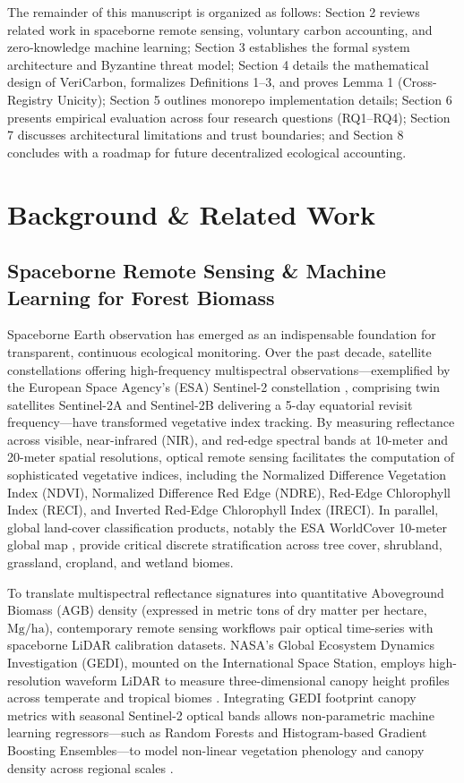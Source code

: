\documentclass[preprint,12pt]{elsarticle}
\begin{document}
The remainder of this manuscript is organized as follows: Section 2 reviews related work in spaceborne remote sensing, voluntary carbon accounting, and zero-knowledge machine learning; Section 3 establishes the formal system architecture and Byzantine threat model; Section 4 details the mathematical design of VeriCarbon, formalizes Definitions 1–3, and proves Lemma 1 (Cross-Registry Unicity); Section 5 outlines monorepo implementation details; Section 6 presents empirical evaluation across four research questions (RQ1–RQ4); Section 7 discusses architectural limitations and trust boundaries; and Section 8 concludes with a roadmap for future decentralized ecological accounting.


\section{Background \& Related Work}

\subsection{Spaceborne Remote Sensing \& Machine Learning for Forest Biomass}

Spaceborne Earth observation has emerged as an indispensable foundation for transparent, continuous ecological monitoring. Over the past decade, satellite constellations offering high-frequency multispectral observations—exemplified by the European Space Agency's (ESA) Sentinel-2 constellation \cite{drusch2012sentinel}, comprising twin satellites Sentinel-2A and Sentinel-2B delivering a 5-day equatorial revisit frequency—have transformed vegetative index tracking. By measuring reflectance across visible, near-infrared (NIR), and red-edge spectral bands at 10-meter and 20-meter spatial resolutions, optical remote sensing facilitates the computation of sophisticated vegetative indices, including the Normalized Difference Vegetation Index (NDVI), Normalized Difference Red Edge (NDRE), Red-Edge Chlorophyll Index (RECI), and Inverted Red-Edge Chlorophyll Index (IRECI). In parallel, global land-cover classification products, notably the ESA WorldCover 10-meter global map \cite{zanaga2021esa}, provide critical discrete stratification across tree cover, shrubland, grassland, cropland, and wetland biomes.

To translate multispectral reflectance signatures into quantitative Aboveground Biomass (AGB) density (expressed in metric tons of dry matter per hectare, $\text{Mg}/\text{ha}$), contemporary remote sensing workflows pair optical time-series with spaceborne LiDAR calibration datasets. NASA's Global Ecosystem Dynamics Investigation (GEDI), mounted on the International Space Station, employs high-resolution waveform LiDAR to measure three-dimensional canopy height profiles across temperate and tropical biomes \cite{dubayah2020global,duncanson2022aboveground}. Integrating GEDI footprint canopy metrics with seasonal Sentinel-2 optical bands allows non-parametric machine learning regressors—such as Random Forests and Histogram-based Gradient Boosting Ensembles—to model non-linear vegetation phenology and canopy density across regional scales \cite{lang2023high,santoro2021global}. 
\end{document}
